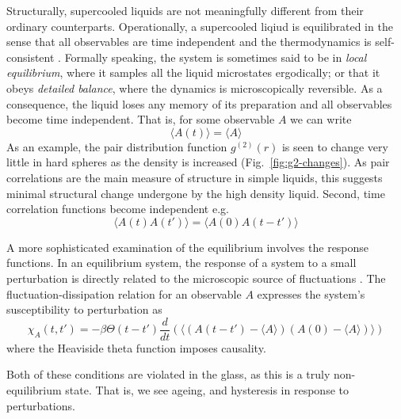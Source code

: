 Structurally, supercooled liquids are not meaningfully different from their ordinary counterparts.
Operationally, a supercooled liqiud is equilibrated in the sense that all observables are time independent and the thermodynamics is self-consistent%
.
Formally speaking, the system is sometimes said to be in \emph{local equilibrium}, where it samples all the liquid microstates ergodically; or that it obeys \emph{detailed balance}, where the dynamics is microscopically reversible.
As a consequence, the liquid loses any memory of its preparation and all observables become time independent.
That is, for some observable $A$ we can write
\begin{equation*}
  \langle A(t) \rangle = \langle A \rangle
\end{equation*}
As an example, the pair distribution function $g^{(2)}(r)$ is seen to change very little in hard spheres as the density is increased (Fig.\ \ref{fig:g2-changes}).
As pair correlations are the main measure of structure in simple liquids, this suggests minimal structural change undergone by the high density liquid.
Second, time correlation functions become independent e.g.\
\begin{equation*}
  \langle A(t) A(t') \rangle = \langle A(0) A(t - t') \rangle
\end{equation*}

A more sophisticated examination of the equilibrium involves the response functions.
In an equilibrium system, the response of a system to a small perturbation is directly related to the microscopic source of fluctuations%
\marginfootnote{Temperature, in the case of liquids.}.
The fluctuation-dissipation relation for an observable $A$ expresses the system's susceptibility to perturbation as
\begin{equation*}
  \chi_A (t, t')
  =
  - \beta \Theta(t - t')
  \frac{d}{dt}
  \left(
  \bigg\langle
  (A(t - t') - \langle A \rangle)
  (A(0) - \langle A \rangle)
  \bigg\rangle
  \right)
\end{equation*}
where the Heaviside theta function imposes causality.

Both of these conditions are violated in the glass, as this is a truly non-equilibrium state.
That is, we see ageing, and hysteresis in response to perturbations.

